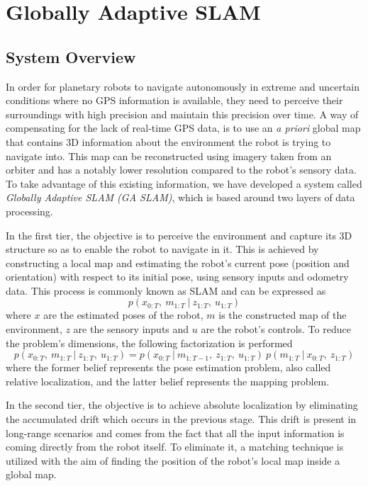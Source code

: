 \label{Chapter2}

\chapter{Globally Adaptive SLAM}

\section{System Overview} \label{system_overview}

In order for planetary robots to navigate autonomously in extreme and
uncertain conditions where no GPS information is available,
they need to perceive their surroundings with high precision and
maintain this precision over time.
A way of compensating for the lack of real-time GPS data, is to use
an \textit{a priori} global map that contains 3D information about the
environment the robot is trying to navigate into.
This map can be reconstructed using imagery taken from an orbiter and
has a notably lower resolution compared to the robot's sensory data.
To take advantage of this existing information, we have developed a system
called \textit{Globally Adaptive SLAM (GA SLAM)},
which is based around two layers of data processing.

In the first tier, the objective is to perceive the environment and
capture its 3D structure so as to enable the robot to navigate in it.
This is achieved by constructing a local map and estimating the robot's
current pose (position and orientation) with respect to its initial pose,
using sensory inputs and odometry data.
This process is commonly known as SLAM and can be expressed as
\begin{equation}
    p(x_{0:T} ,\ m_{1:T} \ | \ z_{1:T} ,\ u_{1:T})
\end{equation}
where
$x$ are the estimated poses of the robot,
$m$ is the constructed map of the environment,
$z$ are the sensory inputs and
$u$ are the robot's controls.
To reduce the problem's dimensions, the following factorization is performed
\begin{equation}
    p(x_{0:T} ,\ m_{1:T} \ | \ z_{1:T} ,\ u_{1:T}) =
    p(x_{0:T} \ | \ m_{1:T-1} ,\ z_{1:T} ,\ u_{1:T}) \
    p(m_{1:T} \ | \ x_{0:T} ,\ z_{1:T})
\end{equation}
where
the former belief represents the pose estimation problem, also called
relative localization, and the latter belief represents the mapping problem.

In the second tier, the objective is to achieve absolute localization by
eliminating the accumulated drift which occurs in the previous stage.
This drift is present in long-range scenarios and comes from the fact that
all the input information is coming directly from the robot itself.
To eliminate it, a matching technique is utilized with the aim of finding the
position of the robot's local map inside a global map.

